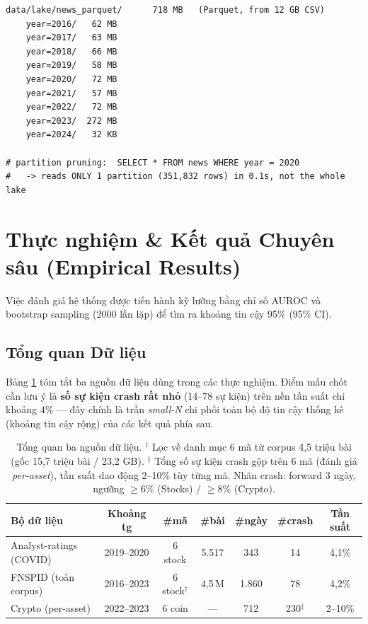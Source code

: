 \documentclass[11pt, a4paper]{article}
\begin{document}
\begin{lstlisting}[numbers=none, caption={Data-lake Parquet phân vùng theo năm: 12 GB CSV $\rightarrow$ 718 MB; \textit{partition pruning} chỉ quét đúng một thư mục năm.}, label={lst:parquet}]
data/lake/news_parquet/      718 MB   (Parquet, from 12 GB CSV)
    year=2016/   62 MB
    year=2017/   63 MB
    year=2018/   66 MB
    year=2019/   58 MB
    year=2020/   72 MB
    year=2021/   57 MB
    year=2022/   72 MB
    year=2023/  272 MB
    year=2024/   32 KB

# partition pruning:  SELECT * FROM news WHERE year = 2020
#   -> reads ONLY 1 partition (351,832 rows) in 0.1s, not the whole lake
\end{lstlisting}

\section{Thực nghiệm \& Kết quả Chuyên sâu (Empirical Results)}

Việc đánh giá hệ thống được tiến hành kỹ lưỡng bằng chỉ số AUROC và bootstrap sampling (2000 lần lặp) để tìm ra khoảng tin cậy 95\% (95\% CI).

\subsection{Tổng quan Dữ liệu}
Bảng \ref{tab:data_overview} tóm tắt ba nguồn dữ liệu dùng trong các thực nghiệm. Điểm mấu chốt cần lưu ý là \textbf{số sự kiện crash rất nhỏ} (14--78 sự kiện) trên nền tần suất chỉ khoảng $4\%$ --- đây chính là trần \textit{small-N} chi phối toàn bộ độ tin cậy thống kê (khoảng tin cậy rộng) của các kết quả phía sau.

\begin{table}[H]
    \centering
    \renewcommand{\arraystretch}{1.2}
    \setlength{\tabcolsep}{4pt}
    {\small
    \begin{tabularx}{\textwidth}{@{} >{\raggedright\arraybackslash}X c c c c c c @{}}
    \toprule
    \textbf{Bộ dữ liệu} & \textbf{Khoảng tg} & \textbf{\#mã} & \textbf{\#bài} & \textbf{\#ngày} & \textbf{\#crash} & \textbf{Tần suất} \\
    \midrule
    Analyst-ratings (COVID) & 2019--2020 & 6 stock & 5.517 & 343 & 14 & 4,1\% \\
    FNSPID (toàn corpus) & 2016--2023 & 6 stock$^\dagger$ & 4,5\,M & 1.860 & 78 & 4,2\% \\
    Crypto (per-asset) & 2022--2023 & 6 coin & --- & 712 & 230$^\ddagger$ & 2--10\% \\
    \bottomrule
    \end{tabularx}
    }
    \caption{Tổng quan ba nguồn dữ liệu. $^\dagger$ Lọc về danh mục 6 mã từ corpus 4,5 triệu bài (gốc 15,7 triệu bài / 23,2 GB). $^\ddagger$ Tổng số sự kiện crash gộp trên 6 mã (đánh giá \textit{per-asset}), tần suất dao động 2--10\% tùy từng mã. Nhãn crash: forward 3 ngày, ngưỡng $\ge 6\%$ (Stocks) / $\ge 8\%$ (Crypto).}
    \label{tab:data_overview}
\end{table}
\end{document}
